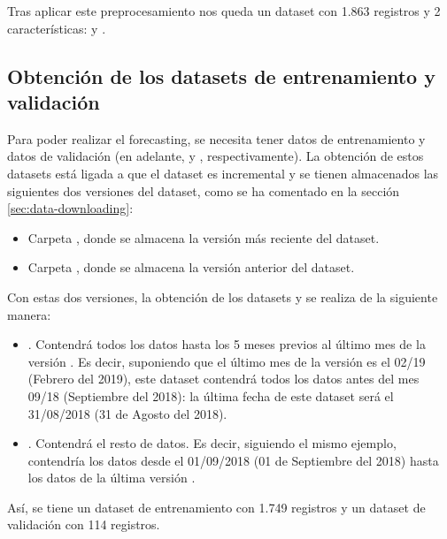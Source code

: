 Tras aplicar este preprocesamiento nos queda un dataset con 1.863 registros y 2 características:  y .




\subsection{Obtención de los datasets de entrenamiento y validación}
\label{sec:dataset-validation}

Para poder realizar el forecasting, se necesita tener datos de entrenamiento y datos de validación (en adelante,  y , respectivamente). La obtención de estos datasets está ligada a que el dataset \citep{dataset} es incremental y se tienen almacenados las siguientes dos versiones del dataset, como se ha comentado en la sección \ref{sec:data-downloading}:

\begin{itemize}
 \item Carpeta  \citep{master}, donde se almacena la versión más reciente del dataset.
 \item Carpeta  \citep{master}, donde se almacena la versión anterior del dataset.
\end{itemize}

Con estas dos versiones, la obtención de los datasets  y  se realiza de la siguiente manera: 

\begin{itemize}
 \item {}. Contendrá todos los datos hasta los 5 meses previos al último mes de la versión . Es decir, suponiendo que el último mes de la versión  es el 02/19 (Febrero del 2019), este dataset contendrá todos los datos antes del mes 09/18 (Septiembre del 2018): la última fecha de este dataset será el 31/08/2018 (31 de Agosto del 2018).
 \item {}. Contendrá el resto de datos. Es decir, siguiendo el mismo ejemplo, contendría los datos desde el 01/09/2018 (01 de Septiembre del 2018) hasta los datos de la última versión .
\end{itemize}

Así, se tiene un dataset de entrenamiento  con 1.749 registros y un dataset de validación  con 114 registros.





